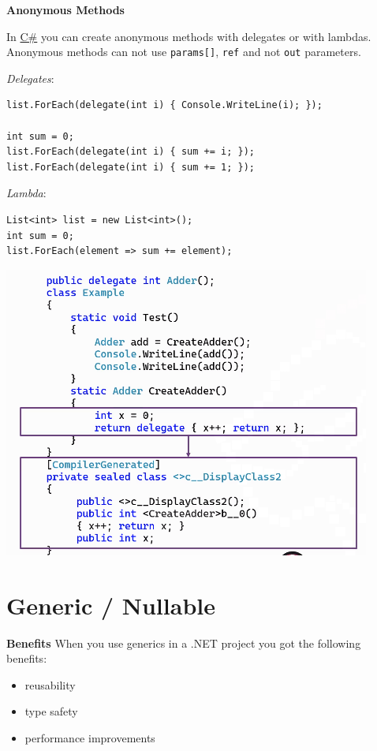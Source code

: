 \documentclass[11pt,twoside,landscape]{article}
\begin{document}
\begin{multicols}{3}
\textbf{Anonymous Methods}

In \href{../../../roam/20211003114158-c.org}{C\#} you can create anonymous methods with delegates or with lambdas.
Anonymous methods can not use \texttt{params[]}, \texttt{ref} and not \texttt{out} parameters.

\emph{Delegates}:
\lstset{language=csharp,label= ,caption= ,captionpos=b,numbers=none}
\begin{lstlisting}
list.ForEach(delegate(int i) { Console.WriteLine(i); });

int sum = 0;
list.ForEach(delegate(int i) { sum += i; });
list.ForEach(delegate(int i) { sum += 1; });
\end{lstlisting}

\emph{Lambda}:
\lstset{language=csharp,label= ,caption= ,captionpos=b,numbers=none}
\begin{lstlisting}
List<int> list = new List<int>();
int sum = 0;
list.ForEach(element => sum += element);
\end{lstlisting}

\begin{center}
\includegraphics[width=.9\linewidth]{img/closures_how_does_it_work.png}
\label{orgb86455a}
\end{center}

\section{Generic / Nullable}
\label{sec:orge116722}

\textbf{Benefits}
When you use generics in a .NET project you got the following benefits:
\begin{itemize}
\item reusability
\item type safety
\item performance improvements
\end{itemize}



\end{multicols}
\end{document}
